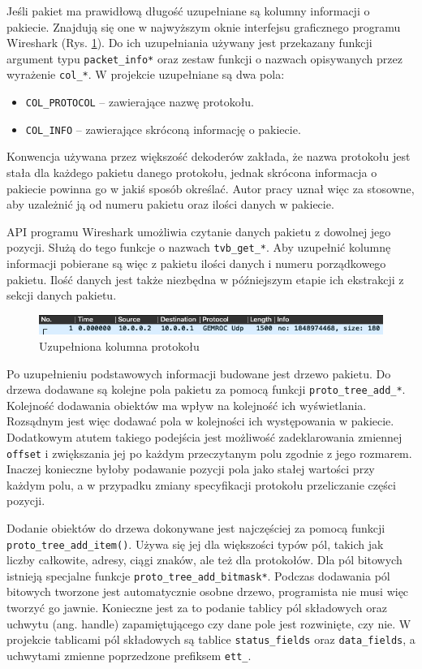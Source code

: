 \documentclass[a4paper, 11pt, twoside, openright]{article}
\begin{document}
	Jeśli pakiet ma prawidłową długość uzupełniane są kolumny informacji o pakiecie. Znajdują się one w najwyższym oknie interfejsu
	graficznego programu Wireshark (Rys. \ref{fig:col}). Do ich uzupełniania używany jest przekazany funkcji argument
	typu \texttt{packet\_info*} oraz zestaw funkcji o nazwach opisywanych przez wyrażenie \texttt{col\_*}. W projekcie uzupełniane są dwa pola:
	\begin{itemize}
		\item \texttt{COL\_PROTOCOL} -- zawierające nazwę protokołu.
		\item \texttt{COL\_INFO} -- zawierające skróconą informację o pakiecie.
	\end{itemize}
	Konwencja używana przez większość dekoderów zakłada, że nazwa protokołu jest stała dla każdego pakietu danego protokołu, jednak skrócona
	informacja o pakiecie powinna go w jakiś sposób określać. Autor pracy uznał więc za stosowne, aby uzależnić ją
	od numeru pakietu oraz ilości danych w pakiecie.

	API programu Wireshark umożliwia czytanie danych pakietu z dowolnej jego pozycji. Służą do tego funkcje o nazwach \texttt{tvb\_get\_*}.
	Aby uzupełnić kolumnę informacji pobierane są więc z pakietu ilości danych i numeru porządkowego pakietu. Ilość danych jest także niezbędna
	w późniejszym etapie ich ekstrakcji z sekcji danych pakietu.

	\begin{figure}[h]
		\centering
			\includegraphics[width=1.0\textwidth]{img/screenshot_col.png}
		\caption{Uzupełniona kolumna protokołu}
		\label{fig:col}
	\end{figure}

	Po uzupełnieniu podstawowych informacji budowane jest drzewo pakietu. Do drzewa dodawane są kolejne pola pakietu za pomocą
	funkcji \texttt{proto\_tree\_add\_*}. Kolejność dodawania obiektów ma wpływ na kolejność ich wyświetlania. Rozsądnym jest więc
	dodawać pola w kolejności ich występowania w pakiecie. Dodatkowym atutem takiego podejścia jest możliwość zadeklarowania zmiennej \texttt{offset}
	i zwiększania jej po każdym przeczytanym polu zgodnie z jego rozmarem. Inaczej konieczne byłoby podawanie pozycji pola jako
	stałej wartości przy każdym polu, a w przypadku zmiany specyfikacji protokołu przeliczanie części pozycji.

	Dodanie obiektów do drzewa dokonywane jest najczęściej za pomocą funkcji \\ \texttt{proto\_tree\_add\_item()}.
	Używa się jej dla większości typów pól, takich jak liczby całkowite, adresy, ciągi znaków, ale też dla protokołów.
	Dla pól bitowych istnieją specjalne funkcje \texttt{proto\_tree\_add\_bitmask*}. Podczas dodawania pól bitowych tworzone jest automatycznie
	osobne drzewo, programista nie musi więc tworzyć go jawnie. Konieczne jest za to podanie tablicy pól składowych
	oraz uchwytu (ang. handle) zapamiętującego czy dane pole jest rozwinięte, czy nie. W projekcie tablicami
	pól składowych są tablice \texttt{status\_fields} oraz \texttt{data\_fields}, a uchwytami zmienne poprzedzone prefiksem \texttt{ett\_}.
\end{document}
